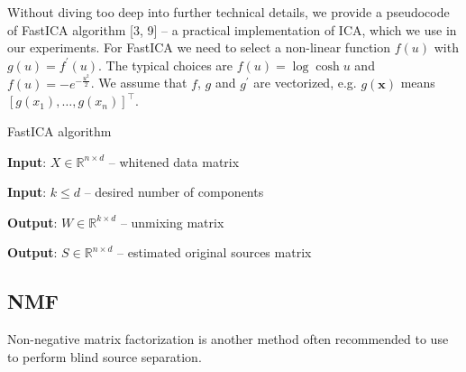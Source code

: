 \documentclass[../main.tex]{subfiles} %
\begin{document}
Without diving too deep into further technical details, we provide a pseudocode of FastICA algorithm [3, 9] -- a practical implementation of ICA, which we use in our experiments. For FastICA we need to select a non-linear function $f(u)$ with $g(u) = f^\prime(u)$. The typical choices are $f(u) = \log\cosh u$ and $f(u) = - e^{-\frac{u^2}{2}}$. We assume that $f$, $g$ and $g^\prime$ are vectorized, e.g. $g(\mathbf{x})$ means $\left[ g(x_1), \ldots, g(x_n) \right]^\top$.

\begin{algorithm} 
	\begin{algorithmic}
		\caption{FastICA algorithm}\label{fastica}
		\item \textbf{Input}: $X \in \mathbb{R}^{n \times d}$ -- whitened data matrix
		\item \textbf{Input}: $k \le d$ -- desired number of components
		\item \textbf{Output}: $W \in \mathbb{R}^{k \times d}$ -- unmixing matrix
		\item \textbf{Output}: $S \in \mathbb{R}^{n \times d}$ -- estimated original sources matrix
		
		 
		 
		 
		\EndWhile
		\EndFor
		\EndFunction
		
	\end{algorithmic}
\end{algorithm}

\subsection{NMF}

Non-negative matrix factorization is another method often recommended to use to perform blind source separation.
\end{document}
